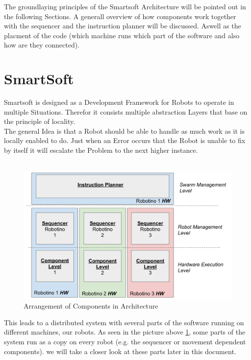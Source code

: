 The groundlaying principles of the Smartsoft Architecture will be pointed out in the following
Sections. A generall overview of how components work together with the sequencer and the instruction planner will be discussed.
Aswell as the placment of the code (which machine runs which part of the software and also how are they connected).

\section{SmartSoft}
Smartsoft is designed as a Development Framework for Robots to operate in multiple Situations.
Therefor it consists multiple abstraction Layers that base on the principle of
locality. \\
The general Idea is that a Robot should be able to handle as much work as it is locally enabled to do.
Just when an Error occurs that the Robot is unable to fix by itself it will escalate the Problem to the next higher instance. \\
\\
\begin{figure}[h]
\centering
\includegraphics[scale=0.23]{pic/architecture2018.png}
\caption{Arrangement of Components in Architecture}
\label{fig:architecture_overview}
\end{figure}

This leads to a distributed system with several parts of the software running on different machines, our robots.
As seen in the picture above \ref{fig:architecture_overview}, some parts of the system run as a copy on every robot
(e.g. the sequencer or movement dependent components). we will take a closer look at these parts later in this document. \\
\\

